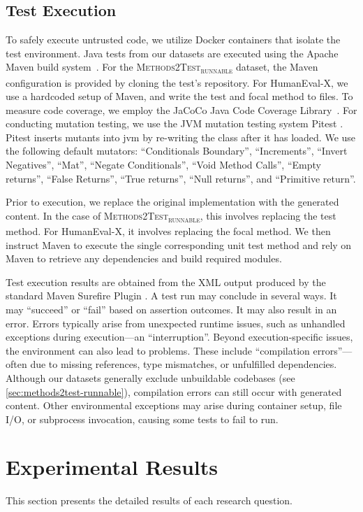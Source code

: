 \documentclass[12pt]{book}
\begin{document}
\subsection{Test Execution}
\label{sec:test-execution}
To safely execute untrusted code, we utilize Docker containers that isolate the test environment. Java tests from our datasets are executed using the Apache Maven build system~\citep{apache-maven:3.8.1}. For the \textsc{Methods2Test\textsubscript{runnable}} dataset, the Maven configuration is provided by cloning the test's repository. For HumanEval-X, we use a hardcoded setup of Maven, and write the test and focal method to files. To measure code coverage, we employ the JaCoCo Java Code Coverage Library~\citep{jacoco:0.8.3}. For conducting mutation testing, we use the JVM mutation testing system Pitest \citet{pitest:1.16.0}. Pitest inserts mutants into jvm by re-writing the class after it has loaded. We use the following default mutators: ``Conditionals Boundary'', ``Increments'', ``Invert Negatives'', ``Mat'', ``Negate Conditionals'', ``Void Method Calls'', ``Empty returns'', ``False Returns'', ``True returns'', ``Null returns'', and ``Primitive return''.

Prior to execution, we replace the original implementation with the generated content. In the case of \textsc{Methods2Test\textsubscript{runnable}}, this involves replacing the test method. For HumanEval-X, it involves replacing the focal method. We then instruct Maven to execute the single corresponding unit test method and rely on Maven to retrieve any dependencies and build required modules.

Test execution results are obtained from the XML output produced by the standard Maven Surefire Plugin \citep{mavensurefireplugin}. A test run may conclude in several ways. It may ``succeed'' or ``fail'' based on assertion outcomes. It may also result in an error. Errors typically arise from unexpected runtime issues, such as unhandled exceptions during execution---an ``interruption''. Beyond execution-specific issues, the environment can also lead to problems. These include ``compilation errors''---often due to missing references, type mismatches, or unfulfilled dependencies. Although our datasets generally exclude unbuildable codebases (see \cref{sec:methods2test-runnable}), compilation errors can still occur with generated content. Other environmental exceptions may arise during container setup, file I/O, or subprocess invocation, causing some tests to fail to run. 

\section{Experimental Results}
\label{chap:experimental-results}
This section presents the detailed results of each research question.
\end{document}
